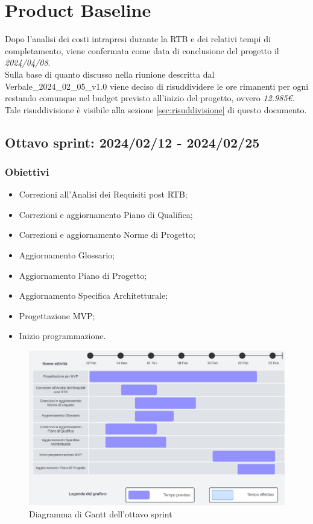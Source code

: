 \section{Product Baseline}
Dopo l'analisi dei costi intrapresi durante la RTB e dei relativi tempi di completamento, viene confermata come data di conclusione del progetto il \textit{2024/04/08}.\\Sulla base di quanto discusso nella riunione descritta dal Verbale\_2024\_02\_05\_v1.0 viene deciso di risuddividere le ore rimanenti per ogni  restando comunque nel budget previsto all'inizio del progetto, ovvero \textit{12.985€}.\\Tale risuddivisione è visibile alla sezione \ref{sec:risuddivisione} di questo documento.

\newpage

\subsection{Ottavo sprint: 2024/02/12 - 2024/02/25}
\subsubsection{Obiettivi}
\begin{itemize}
    \item Correzioni all'Analisi dei Requisiti post RTB;
    \item Correzioni e aggiornamento Piano di Qualifica;
    \item Correzioni e aggiornamento Norme di Progetto;
    \item Aggiornamento Glossario;
    \item Aggiornamento Piano di Progetto;
    \item Aggiornamento Specifica Architetturale;
    \item Progettazione MVP;
    \item Inizio programmazione.
\end{itemize}

\begin{figure}[h!]
    \centering  
    \includegraphics[width=\textwidth]{Roadmap8sprint.png} %
    \caption{Diagramma di Gantt dell'ottavo sprint}
    \label{fig:roadmap8s} %
\end{figure}
\newpage

